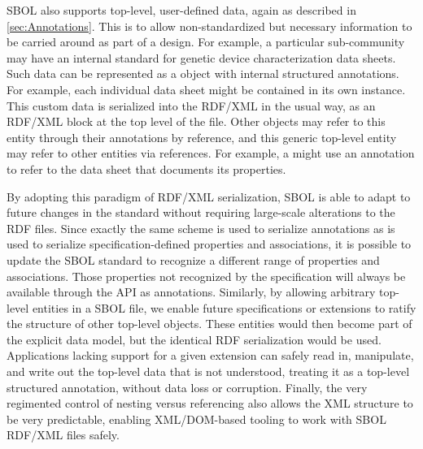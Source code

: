 SBOL also supports top-level, user-defined data, again as described in \ref{sec:Annotations}. This is to allow non-standardized but necessary information to be carried around as part of a design. For example, a particular sub-community may have an internal standard for genetic device characterization data sheets. 
Such data can be represented as a  object with internal structured annotations. 
For example, each individual data sheet might be contained in its own  instance.
This custom data is serialized into the RDF/XML in the usual way, as an RDF/XML block at the top level of the file. 
Other objects may refer to this entity through their annotations by reference, and this generic top-level entity may refer to other entities via references.
For example, a  might use an annotation to refer to the data sheet  that documents its properties.

By adopting this paradigm of RDF/XML serialization, SBOL is able to adapt to future changes in the standard without requiring large-scale alterations to the RDF files. Since exactly the same scheme is used to serialize annotations as is used to serialize specification-defined properties and associations, it is possible to update the SBOL standard to recognize a different range of properties and associations. Those properties not recognized by the specification will always be available through the API as annotations. Similarly, by allowing arbitrary top-level entities in a SBOL file, we enable future specifications or extensions to ratify the structure of other top-level objects. These entities would then become part of the explicit data model, but the identical RDF serialization would be used. Applications lacking support for a given extension can safely read in, manipulate, and write out the top-level data that is not understood, treating it as a top-level structured annotation, without data loss or corruption. Finally, the very regimented control of nesting versus referencing also allows the XML structure to be very predictable, enabling XML/DOM-based tooling to work with SBOL RDF/XML files safely.
